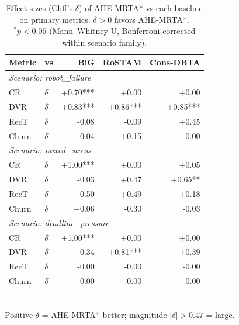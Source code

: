 \begin{table}[t]
\centering
\caption{Effect sizes (Cliff's $\delta$) of AHE-MRTA* vs each baseline on primary metrics. $\delta>0$ favors AHE-MRTA*. $^{*}p{<}0.05$ (Mann--Whitney U, Bonferroni-corrected within scenario family).}
\label{tab:effectsize}
\small
\begin{tabular}{llrrr}
\toprule
\textbf{Metric} & \textbf{vs} & \textbf{BiG} & \textbf{RoSTAM} & \textbf{Cons-DBTA} \\
\midrule
\multicolumn{5}{l}{\textit{Scenario: robot\_failure}} \\
CR & $\delta$ & +0.70*** & +0.00 & +0.00 \\
DVR & $\delta$ & +0.83*** & +0.86*** & +0.85*** \\
RecT & $\delta$ & -0.08 & -0.09 & +0.45 \\
Churn & $\delta$ & -0.04 & +0.15 & -0.00 \\
\midrule
\multicolumn{5}{l}{\textit{Scenario: mixed\_stress}} \\
CR & $\delta$ & +1.00*** & +0.00 & +0.05 \\
DVR & $\delta$ & -0.03 & +0.47 & +0.65** \\
RecT & $\delta$ & -0.50 & +0.49 & +0.18 \\
Churn & $\delta$ & +0.06 & -0.30 & -0.03 \\
\midrule
\multicolumn{5}{l}{\textit{Scenario: deadline\_pressure}} \\
CR & $\delta$ & +1.00*** & +0.00 & +0.00 \\
DVR & $\delta$ & +0.34 & +0.81*** & +0.39 \\
RecT & $\delta$ & -0.00 & -0.00 & -0.00 \\
Churn & $\delta$ & -0.00 & -0.00 & -0.00 \\
\bottomrule
\end{tabular}
\\[2pt]\footnotesize Positive $\delta$ = AHE-MRTA* better; magnitude $|\delta|{>}0.47$ = large.
\end{table}
